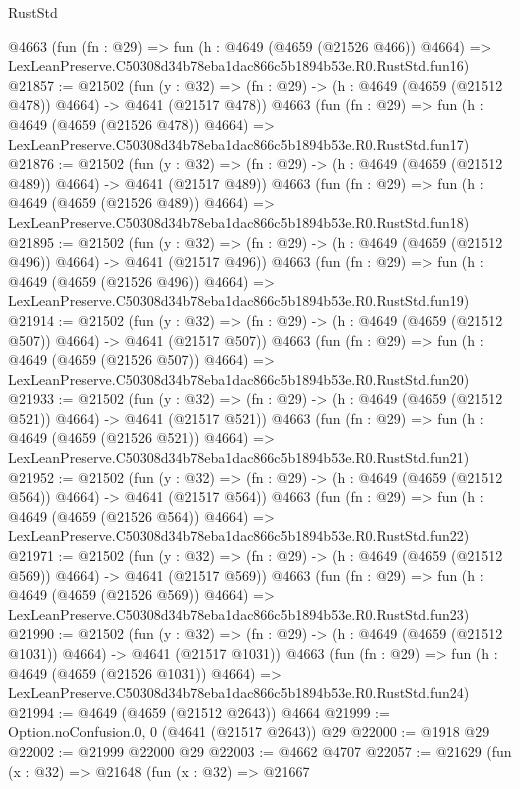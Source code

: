 \begin{lexlean}{RustStd}
\begin{coremodule}
    @4663
    (fun (fn : @29) =>
    fun (h : @4649 (@4659 (@21526 @466)) @4664) =>
    LexLeanPreserve.C50308d34b78eba1dac866c5b1894b53e.R0.RustStd.fun16)
@21857 := @21502
    (fun (y : @32) => (fn : @29) -> (h : @4649 (@4659 (@21512 @478)) @4664) -> @4641 (@21517 @478))
    @4663
    (fun (fn : @29) =>
    fun (h : @4649 (@4659 (@21526 @478)) @4664) =>
    LexLeanPreserve.C50308d34b78eba1dac866c5b1894b53e.R0.RustStd.fun17)
@21876 := @21502
    (fun (y : @32) => (fn : @29) -> (h : @4649 (@4659 (@21512 @489)) @4664) -> @4641 (@21517 @489))
    @4663
    (fun (fn : @29) =>
    fun (h : @4649 (@4659 (@21526 @489)) @4664) =>
    LexLeanPreserve.C50308d34b78eba1dac866c5b1894b53e.R0.RustStd.fun18)
@21895 := @21502
    (fun (y : @32) => (fn : @29) -> (h : @4649 (@4659 (@21512 @496)) @4664) -> @4641 (@21517 @496))
    @4663
    (fun (fn : @29) =>
    fun (h : @4649 (@4659 (@21526 @496)) @4664) =>
    LexLeanPreserve.C50308d34b78eba1dac866c5b1894b53e.R0.RustStd.fun19)
@21914 := @21502
    (fun (y : @32) => (fn : @29) -> (h : @4649 (@4659 (@21512 @507)) @4664) -> @4641 (@21517 @507))
    @4663
    (fun (fn : @29) =>
    fun (h : @4649 (@4659 (@21526 @507)) @4664) =>
    LexLeanPreserve.C50308d34b78eba1dac866c5b1894b53e.R0.RustStd.fun20)
@21933 := @21502
    (fun (y : @32) => (fn : @29) -> (h : @4649 (@4659 (@21512 @521)) @4664) -> @4641 (@21517 @521))
    @4663
    (fun (fn : @29) =>
    fun (h : @4649 (@4659 (@21526 @521)) @4664) =>
    LexLeanPreserve.C50308d34b78eba1dac866c5b1894b53e.R0.RustStd.fun21)
@21952 := @21502
    (fun (y : @32) => (fn : @29) -> (h : @4649 (@4659 (@21512 @564)) @4664) -> @4641 (@21517 @564))
    @4663
    (fun (fn : @29) =>
    fun (h : @4649 (@4659 (@21526 @564)) @4664) =>
    LexLeanPreserve.C50308d34b78eba1dac866c5b1894b53e.R0.RustStd.fun22)
@21971 := @21502
    (fun (y : @32) => (fn : @29) -> (h : @4649 (@4659 (@21512 @569)) @4664) -> @4641 (@21517 @569))
    @4663
    (fun (fn : @29) =>
    fun (h : @4649 (@4659 (@21526 @569)) @4664) =>
    LexLeanPreserve.C50308d34b78eba1dac866c5b1894b53e.R0.RustStd.fun23)
@21990 := @21502
    (fun (y : @32) =>
    (fn : @29) -> (h : @4649 (@4659 (@21512 @1031)) @4664) -> @4641 (@21517 @1031))
    @4663
    (fun (fn : @29) =>
    fun (h : @4649 (@4659 (@21526 @1031)) @4664) =>
    LexLeanPreserve.C50308d34b78eba1dac866c5b1894b53e.R0.RustStd.fun24)
@21994 := @4649 (@4659 (@21512 @2643)) @4664
@21999 := Option.noConfusion.{0, 0} (@4641 (@21517 @2643)) @29
@22000 := @1918 @29
@22002 := @21999 @22000 @29
@22003 := @4662 @4707
@22057 := @21629
    (fun (x : @32) =>
    @21648
      (fun (x : @32) =>
      @21667

\end{coremodule}
\end{lexlean}
